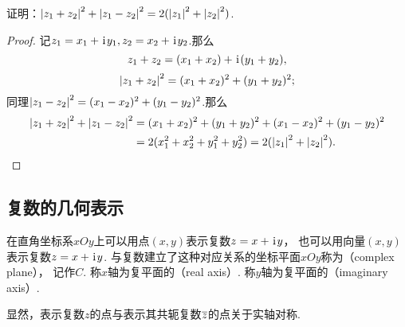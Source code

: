 \begin{example}
证明：\(\abs{z_1+z_2}^2 + \abs{z_1-z_2}^2 = 2 (\abs{z_1}^2 + \abs{z_2}^2)\).
\begin{proof}
记\(z_1 = x_1 + \kern1pt\mathrm{i}\kern1pt y_1, z_2 = x_2 + \kern1pt\mathrm{i}\kern1pt y_2\).那么\[
z_1+z_2 = (x_1+x_2) + \kern1pt\mathrm{i}\kern1pt(y_1+y_2),
\]\[
\abs{z_1+z_2}^2 = (x_1+x_2)^2 + (y_1+y_2)^2;
\]同理\(\abs{z_1-z_2}^2 = (x_1-x_2)^2 + (y_1-y_2)^2\).那么\begin{align*}
\abs{z_1+z_2}^2 + \abs{z_1-z_2}^2
&= (x_1+x_2)^2 + (y_1+y_2)^2
+ (x_1-x_2)^2 + (y_1-y_2)^2 \\
&= 2 ( x_1^2 + x_2^2 + y_1^2 + y_2^2 )
= 2 ( \abs{z_1}^2 + \abs{z_2}^2 ).
\qedhere
\end{align*}
\end{proof}
\end{example}

\subsection{复数的几何表示}
\begin{definition}[复数在复平面上的几何表示]
在直角坐标系\(xOy\)上可以用点\((x,y)\)表示复数\(z=x+\kern1pt\mathrm{i}\kern1pt y\)，
也可以用向量\((x,y)\)表示复数\(z=x+\kern1pt\mathrm{i}\kern1pt y\).
与复数建立了这种对应关系的坐标平面\(xOy\)称为（complex plane），
记作\(C\).
称\(x\)轴为复平面的（real axis）.
称\(y\)轴为复平面的（imaginary axis）.

显然，表示复数\(z\)的点与表示其共轭复数\(\overline{z}\)的点关于实轴对称.
\end{definition}

